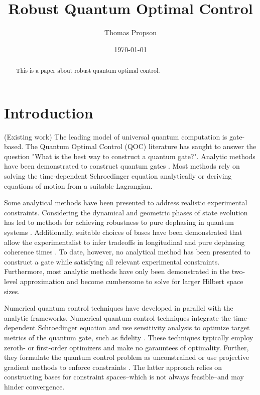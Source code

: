 \documentclass[
  amsfonts,
  amsmath,
  tbtags,
  amssymb,
  aps,
  nobibnotes,
  prl,
  twocolumn,
]{revtex4-2}
\begin{document}
\title{Robust Quantum Optimal Control}

\author{Thomas Propson}

\date{\today}


\begin{abstract}
  This is a paper about robust quantum optimal control.
\end{abstract}

\maketitle


\section{Introduction}
(Existing work) The leading model of universal
quantum computation is gate-based. The Quantum Optimal Control (QOC)
literature has saught to answer the question "What is the best way to construct a quantum gate?".
Analytic methods
have been demonstrated to construct quantum gates
\cite{zhang2020universal, huang2020engineering, han2020experimental,
  xu2020nonadiabatic, carlini2005quantum}.
Most methods rely on solving the time-dependent
Schroedinger equation analytically or deriving equations of motion
from a suitable Lagrangian.

Some analytical methods
have been presented to address realistic experimental constraints.
Considering the dynamical and geometric phases of state
evolution has led to methods for achieving
robustness to pure dephasing in quantum systems
\cite{xu2020nonadiabitc, han2020experimental, merrill2014progress}.
Additionally, suitable choices of bases have been demonstrated that
allow the experimentalist to infer tradeoffs in longitudinal
and pure dephasing coherence times \cite{huang2020engineering}.
To date, however, no analytical method has been presented
to construct a gate while satisfying all relevant experimental
constraints. Furthermore, most analytic methods have only
been demonstrated in the two-level approximation and become
cumbersome to solve for larger Hilbert space sizes.

Numerical quantum control techniques have developed in parallel
with the analytic frameworks. Numerical quantum control
techniques integrate the time-dependent Schroedinger
equation and use sensitivity analysis to optimize target metrics
of the quantum gate, such as fidelity
\cite{leung2017speedup,  goerz2019krotov, doria2011optimal,
  abdelhafez2019gradient, machnes2015gradient, leng2019robust}.
These techniques typically employ zeroth- or first-order
optimizers and make no garauntees of optimality.
Further, they formulate the quantum control
problem as unconstrained or use
projective gradient methods to enforce constraints
\cite{machnes2015gradient}.
The latter approach relies on constructing
bases for constraint spaces--which is not always feasible--and
may hinder convergence.
\end{document}
